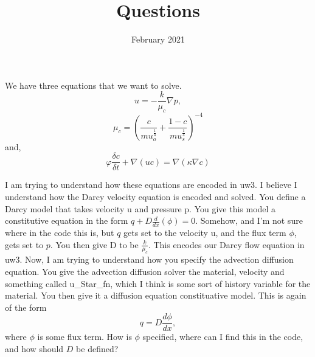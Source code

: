 \documentclass{article}
\title{Questions}
\author{}
\date{February 2021}
\begin{document}
\maketitle

We have three equations that we want to solve.
$$ u = - \frac{k}{\mu_c}\nabla p,$$
$$ \mu_c = \left( \frac{c}{mu_o^{\frac{1}{4}}} +  \frac{1-c}{mu_s^{\frac{1}{4}}} \right)^{-4} $$
and,
$$ \varphi \frac{\delta c}{\delta t} + \nabla(uc) = \nabla(\kappa\nabla c)  $$

I am trying to understand how these equations are encoded in uw3.
\newline
I believe I understand how the Darcy velocity equation is encoded and solved. You define a Darcy model that takes velocity u and pressure p. You give this model a constitutive equation in the form $q + D \frac{d}{d x} (\phi) = 0$. Somehow, and I'm not sure where in the code this is, but $q$ gets set to the velocity u, and the flux term $\phi$, gets set to $p$. You then give D to be $\frac{k}{\mu_c}$. This encodes our Darcy flow equation in uw3.
\newline
Now, I am trying to understand how you specify the advection diffusion equation. You give the advection diffusion solver the material, velocity and something called u\_Star\_fn, which I think is some sort of history variable for the material. You then give it a diffusion equation constituative model. This is again of the form 
\begin{equation}
	q = D \frac{d \phi}{d x},
\end{equation}
where $\phi$ is some flux term. How is $\phi$ specified, where can I find this in the code, and how should $D$ be defined? 
\end{document}
